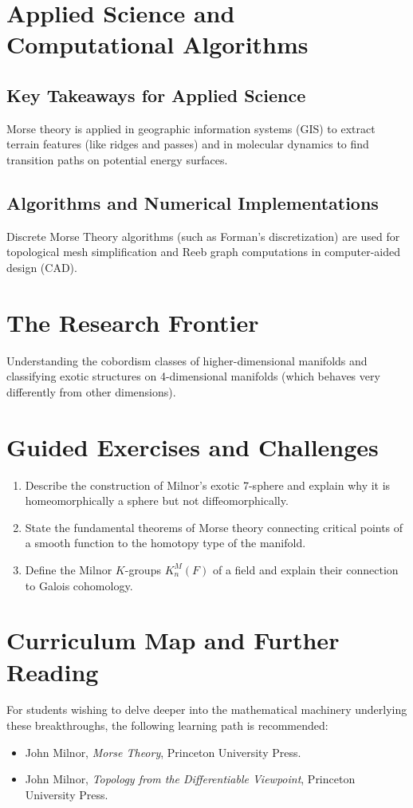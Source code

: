 \section{Applied Science and Computational Algorithms}
\subsection{Key Takeaways for Applied Science}
Morse theory is applied in geographic information systems (GIS) to extract terrain features (like ridges and passes) and in molecular dynamics to find transition paths on potential energy surfaces.

\subsection{Algorithms and Numerical Implementations}
Discrete Morse Theory algorithms (such as Forman's discretization) are used for topological mesh simplification and Reeb graph computations in computer-aided design (CAD).

\section{The Research Frontier}
Understanding the cobordism classes of higher-dimensional manifolds and classifying exotic structures on 4-dimensional manifolds (which behaves very differently from other dimensions).

\section{Guided Exercises and Challenges}
\begin{enumerate}[label=\textbf{\arabic*.}]
  \item Describe the construction of Milnor's exotic 7-sphere and explain why it is homeomorphically a sphere but not diffeomorphically.
  \item State the fundamental theorems of Morse theory connecting critical points of a smooth function to the homotopy type of the manifold.
  \item Define the Milnor $K$-groups $K_n^M(F)$ of a field and explain their connection to Galois cohomology.
\end{enumerate}

\section{Curriculum Map and Further Reading}
For students wishing to delve deeper into the mathematical machinery underlying these breakthroughs, the following learning path is recommended:
\begin{itemize}
  \item John Milnor, \emph{Morse Theory}, Princeton University Press.
  \item John Milnor, \emph{Topology from the Differentiable Viewpoint}, Princeton University Press.
\end{itemize}

